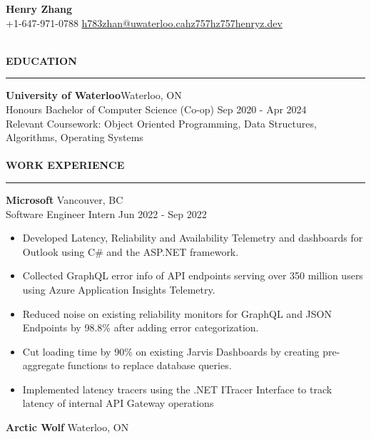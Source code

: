 \documentclass[11pt]{article}
\def \prim {MidnightBlue}
\def \linkedinicon {\faLinkedinSquare}
\def \githubicon {\faGithubSquare}
\def \link {\faLink}
\def \phone {\faMobile}
\def \email {\faEnvelope}
\begin{document}
\color{\prim}
\sffamily
\noindent
\begin{center}
\Huge
\textbf{Henry Zhang}\\[5pt]
\normalsize
\noindent
\small
\phone\space\space +1-647-971-0788 \space\space\space\email\space\space\href{mailto:h783zhan@uwaterloo.ca}{h783zhan@uwaterloo.ca}\space\space\space\linkedinicon\space\space\href{https://linkedin.com/in/henry-zhang-476217176}{hz757}\space\space\space\githubicon\space\space\href{https://github.com/hz757}{hz757}\space\space\space\link\space\space\href{https://henryz.dev/}{henryz.dev}
\end{center}
\normalsize
\noindent
\color{\prim}
\large  \\
\space\textbf{EDUCATION}
\normalsize
\vspace{1.1pt}
\hrule
\color{Black}
\medskip
\noindent 
\textbf{University of Waterloo}\hfill Waterloo, ON \\
Honours Bachelor of Computer Science (Co-op) \hfill Sep 2020 - Apr 2024 \\
Relevant Coursework: Object Oriented Programming, Data Structures, Algorithms, Operating Systems \\
\noindent
\color{\prim}
\large \\
\space\textbf{WORK EXPERIENCE}
\normalsize
\vspace{1.1pt}
\hrule
\color{Black}
\medskip
\noindent\textbf{Microsoft} \hfill Vancouver, BC \\
Software Engineer Intern \hfill Jun 2022 - Sep 2022
\begin{itemize}[noitemsep, topsep=2pt, parsep=2pt]
\item
Developed Latency, Reliability and Availability Telemetry and dashboards for Outlook using C\# and the ASP.NET framework.
\item
Collected GraphQL error info of API endpoints serving over 350 million users using Azure Application Insights Telemetry.
\item
Reduced noise on existing reliability monitors for GraphQL and JSON Endpoints by 98.8\% after adding error categorization.
\item
Cut loading time by 90\% on existing Jarvis Dashboards by creating pre-aggregate functions to replace database queries.
\item
Implemented latency tracers using the .NET ITracer Interface to track latency of internal API Gateway operations \\
\end{itemize} 
\noindent\textbf{Arctic Wolf} \hfill Waterloo, ON\\
\end{document}
